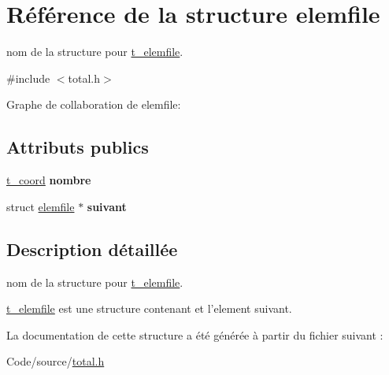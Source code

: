 \hypertarget{structelemfile}{\section{Référence de la structure elemfile}
\label{structelemfile}
}


nom de la structure pour \hyperlink{structt__elemfile}{t\-\_\-elemfile}.  




{\ttfamily \#include $<$total.\-h$>$}



Graphe de collaboration de elemfile\-:
\subsection*{Attributs publics}
\begin{DoxyCompactItemize}
\item 
\hypertarget{structelemfile_a50473116d79b1083db184bc369e6a046}{\hyperlink{structt__coord}{t\-\_\-coord} {\bfseries nombre}}\label{structelemfile_a50473116d79b1083db184bc369e6a046}

\item 
\hypertarget{structelemfile_ac30f23198c9ecf2929d10096f7ffcc3f}{struct \hyperlink{structelemfile}{elemfile} $\ast$ {\bfseries suivant}}\label{structelemfile_ac30f23198c9ecf2929d10096f7ffcc3f}

\end{DoxyCompactItemize}


\subsection{Description détaillée}
nom de la structure pour \hyperlink{structt__elemfile}{t\-\_\-elemfile}. 

\hyperlink{structt__elemfile}{t\-\_\-elemfile} est une structure contenant et l'element suivant. 

La documentation de cette structure a été générée à partir du fichier suivant \-:\begin{DoxyCompactItemize}
\item 
Code/source/\hyperlink{total_8h}{total.\-h}\end{DoxyCompactItemize}
